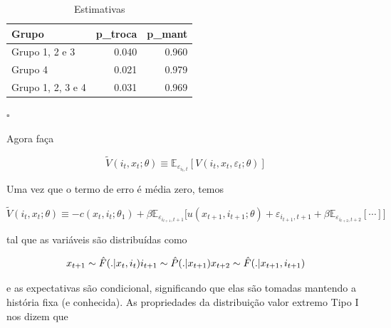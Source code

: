 \documentclass[12pt,a4paper]{article}
\newenvironment{Shaded}{\begin{snugshade}}{\end{snugshade}}
\newcommand{\CommentTok}[1]{\textcolor[rgb]{0.56,0.35,0.01}{\textit{#1}}}
\newcommand{\DataTypeTok}[1]{\textcolor[rgb]{0.13,0.29,0.53}{#1}}
\newcommand{\DecValTok}[1]{\textcolor[rgb]{0.00,0.00,0.81}{#1}}
\newcommand{\KeywordTok}[1]{\textcolor[rgb]{0.13,0.29,0.53}{\textbf{#1}}}
\newcommand{\NormalTok}[1]{#1}
\newcommand{\OperatorTok}[1]{\textcolor[rgb]{0.81,0.36,0.00}{\textbf{#1}}}
\newcommand{\OtherTok}[1]{\textcolor[rgb]{0.56,0.35,0.01}{#1}}
\newcommand{\StringTok}[1]{\textcolor[rgb]{0.31,0.60,0.02}{#1}}
\begin{document}
\begin{Shaded}
\end{Shaded}

\begin{table}[ht]
\centering
\begin{tabular}{lrr}
  \hline
Grupo & p\_troca & p\_mant \\ 
  \hline
Grupo 1, 2 e 3 & 0.040 & 0.960 \\ 
  Grupo 4 & 0.021 & 0.979 \\ 
  Grupo 1, 2, 3 e 4 & 0.031 & 0.969 \\ 
   \hline
\end{tabular}
\caption{Estimativas} 
\label{tab:6}
\end{table}

\(\square\)

Agora faça

\[
\tilde{V} (i_t,x_t;\theta) \equiv \mathbb{E}_{\varepsilon_{i_{t},t}}[V(i_t,x_t,\varepsilon_t;\theta)]
\]

Uma vez que o termo de erro é média zero, temos

\[
\tilde{V} (i_t,x_t;\theta) \equiv -c(x_t,i_t;\theta_1) + \beta \mathbb{E}_{\varepsilon_{i_{t+1},t+1}}\Big[u(x_{t+1},i_{t+1};\theta)+\varepsilon_{i_{t+1},t+1}+\beta\mathbb{E}_{\varepsilon_{i_{t+2},t+2}}[\cdots]\Big]
\]

tal que as variáveis são distribuídas como

\[
x_{t+1} \sim \hat{F}(.|x_t,i_t) \\
i_{t+1} \sim \hat{P}(.|x_{t+1}) \\
x_{t+2} \sim \hat{F}(.|x_{t+1},i_{t+1}) \\
\]

e as expectativas são condicional, significando que elas são tomadas
mantendo a história fixa (e conhecida). As propriedades da distribuição
valor extremo Tipo I nos dizem que
\end{document}
